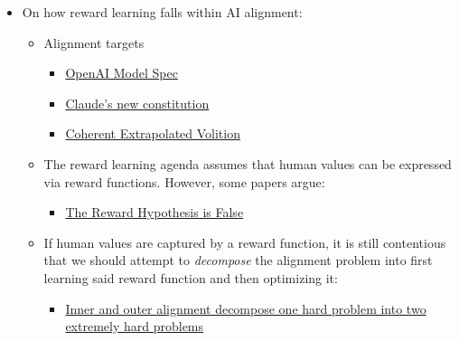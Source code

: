 \documentclass[11pt]{article}
\begin{document}
\begin{itemize}
\begin{itemize}
    \item \href{https://arxiv.org/abs/2405.17713}{AI Alignment with Changeable and Influenceable Reward Functions}: This paper breaks with the typical assumption of a fixed reward function.
    \item \href{https://arxiv.org/abs/2404.10271}{Social Choice Should Guide AI Alignment in Dealing with Diverse Human Feedback}: This paper breaks with the typical assumption of a \emph{single} reward function.
    \begin{itemize}
      \item Potential answer: \href{https://www.anthropic.com/research/collective-constitutional-ai-aligning-a-language-model-with-public-input}{Collective Constitutional AI: Aligning a Language Model with Public Input}
    \end{itemize}
  \end{itemize}
  \item On how reward learning falls within AI alignment:
  \begin{itemize}
    \item Alignment targets
    \begin{itemize}
      \item \href{https://model-spec.openai.com/2025-12-18.html}{OpenAI Model Spec}
      \item \href{https://www.anthropic.com/news/claude-new-constitution}{Claude’s new constitution}
      \item \href{https://intelligence.org/files/CEV.pdf}{Coherent Extrapolated Volition}
    \end{itemize}
    \item The reward learning agenda assumes that human values can be expressed via reward functions. However, some papers argue:
    \begin{itemize}
      \item \href{https://openreview.net/forum?id=5l1NgpzAfH}{The Reward Hypothesis is False}
    \end{itemize}
    \item If human values are captured by a reward function, it is still contentious that we should attempt to \emph{decompose} the alignment problem into first learning said reward function and then optimizing it:
    \begin{itemize}
      \item \href{https://www.lesswrong.com/posts/gHefoxiznGfsbiAu9/inner-and-outer-alignment-decompose-one-hard-problem-into}{Inner and outer alignment decompose one hard problem into two extremely hard problems}

\end{itemize}
\end{itemize}
\end{itemize}
\end{document}
